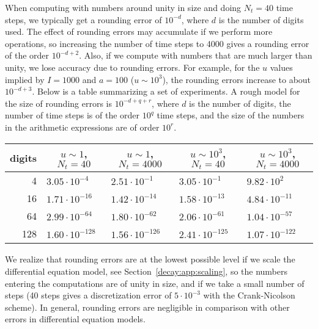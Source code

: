 \documentclass[graybox,sectrefs,envcountresetchap,open=right,final]{svmonodo}
\begin{document}
When computing with numbers around unity in size and doing $N_t=40$
time steps, we typically get a rounding error of $10^{-d}$, where $d$
is the number of digits used. The effect of rounding errors may
accumulate if we perform more operations, so increasing the number of
time steps to 4000 gives a rounding error of the order $10^{-d+2}$.
Also, if we compute with numbers that are much larger than unity, we
lose accuracy due to rounding errors. For example, for the $u$ values
implied by $I=1000$ and $a=100$ ($u\sim 10^3$), the rounding errors
increase to about $10^{-d+3}$. Below is a table summarizing a set of
experiments. A rough model for the size of rounding errors is
$10^{-d+q+r}$, where $d$ is the number of digits, the number of time
steps is of the order $10^q$ time steps, and the size of the numbers
in the arithmetic expressions are of order $10^r$.



{\small   %

\vspace{4mm}

\begin{tabular}{rllll}
\hline
\multicolumn{1}{c}{ digits } & \multicolumn{1}{c}{ $u\sim 1$, $N_t=40$ } & \multicolumn{1}{c}{ $u\sim 1$, $N_t=4000$ } & \multicolumn{1}{c}{ $u\sim 10^3$, $N_t=40$ } & \multicolumn{1}{c}{ $u\sim 10^3$, $N_t=4000$ } \\
\hline
4      & $3.05\cdot 10^{-4}$   & $2.51\cdot 10^{-1}$   & $3.05\cdot 10^{-1}$    & $9.82\cdot 10^{2}$       \\
16     & $1.71\cdot 10^{-16}$  & $1.42\cdot 10^{-14}$  & $1.58\cdot 10^{-13}$   & $4.84\cdot 10^{-11}$     \\
64     & $2.99\cdot 10^{-64}$  & $1.80\cdot 10^{-62}$  & $2.06\cdot 10^{-61}$   & $1.04\cdot 10^{-57}$     \\
128    & $1.60\cdot 10^{-128}$ & $1.56\cdot 10^{-126}$ & $2.41\cdot 10^{-125}$  & $1.07\cdot 10^{-122}$    \\
\hline
\end{tabular}

\vspace{4mm}

}


\noindent
We realize that rounding errors are at the lowest possible level
if we scale the differential equation model,
see Section~\ref{decay:app:scaling},
so the numbers entering the computations are of unity in size,
and if we take a small number of steps (40 steps gives a discretization error
of $5\cdot 10^{-3}$ with the Crank-Nicolson scheme).
In general, rounding errors are negligible in comparison with other errors
in differential equation models.
\end{document}
